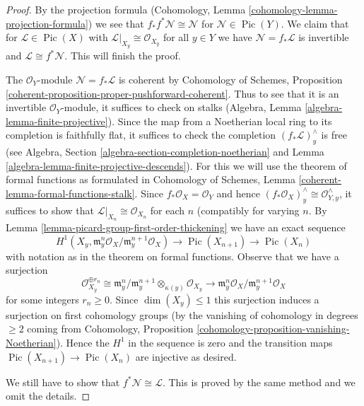 \documentclass[10pt,a4paper]{amsart}
\theoremstyle{plain}
\theoremstyle{definition}
\theoremstyle{remark}
\numberwithin{equation}{subsection}
\def\Pic{\mathop{\mathrm{Pic}}\nolimits}
\begin{document}
\begin{proof}
By the projection formula
(Cohomology, Lemma \ref{cohomology-lemma-projection-formula})
we see that $f_*f^*\mathcal{N} \cong \mathcal{N}$ for
$\mathcal{N} \in \Pic(Y)$.
We claim that for $\mathcal{L} \in \Pic(X)$ with
$\mathcal{L}|_{X_y} \cong \mathcal{O}_{X_y}$
for all $y \in Y$ we have $\mathcal{N} = f_*\mathcal{L}$
is invertible and $\mathcal{L} \cong f^*\mathcal{N}$.
This will finish the proof.

\medskip\noindent
The $\mathcal{O}_Y$-module $\mathcal{N} = f_*\mathcal{L}$
is coherent by Cohomology of Schemes, Proposition
\ref{coherent-proposition-proper-pushforward-coherent}.
Thus to see that it is an invertible $\mathcal{O}_Y$-module,
it suffices to check on stalks (Algebra, Lemma
\ref{algebra-lemma-finite-projective}).
Since the map from a Noetherian local ring to its completion
is faithfully flat, it suffices to check the completion
$(f_*\mathcal{L})_y^\wedge$ is free (see
Algebra, Section \ref{algebra-section-completion-noetherian} and
Lemma \ref{algebra-lemma-finite-projective-descends}).
For this we will use the theorem of formal functions as formulated in
Cohomology of Schemes, Lemma \ref{coherent-lemma-formal-functions-stalk}.
Since $f_*\mathcal{O}_X = \mathcal{O}_Y$ and hence
$(f_*\mathcal{O}_X)_y^\wedge \cong \mathcal{O}_{Y, y}^\wedge$,
it suffices to show that $\mathcal{L}|_{X_n} \cong \mathcal{O}_{X_n}$
for each $n$ (compatibly for varying $n$.
By Lemma \ref{lemma-picard-group-first-order-thickening}
we have an exact sequence
$$
H^1(X_y, \mathfrak m_y^n\mathcal{O}_X/\mathfrak m_y^{n + 1}\mathcal{O}_X)
\to \Pic(X_{n + 1}) \to \Pic(X_n)
$$
with notation as in the theorem on formal functions.
Observe that we have a surjection
$$
\mathcal{O}_{X_y}^{\oplus r_n} \cong
\mathfrak m_y^n/\mathfrak m_y^{n + 1} \otimes_{\kappa(y)} \mathcal{O}_{X_y}
\longrightarrow
\mathfrak m_y^n\mathcal{O}_X/\mathfrak m_y^{n + 1}\mathcal{O}_X
$$
for some integers $r_n \geq 0$.
Since $\dim(X_y) \leq 1$ this surjection induces a surjection
on first cohomology groups (by the vanishing of cohomology in degrees $\geq 2$
coming from Cohomology, Proposition
\ref{cohomology-proposition-vanishing-Noetherian}).
Hence the $H^1$ in the sequence is zero and the transition maps
$\Pic(X_{n + 1}) \to \Pic(X_n)$ are injective as desired.

\medskip\noindent
We still have to show that $f^*\mathcal{N} \cong \mathcal{L}$.
This is proved by the same method and we omit the details.
\end{proof}
\end{document}
